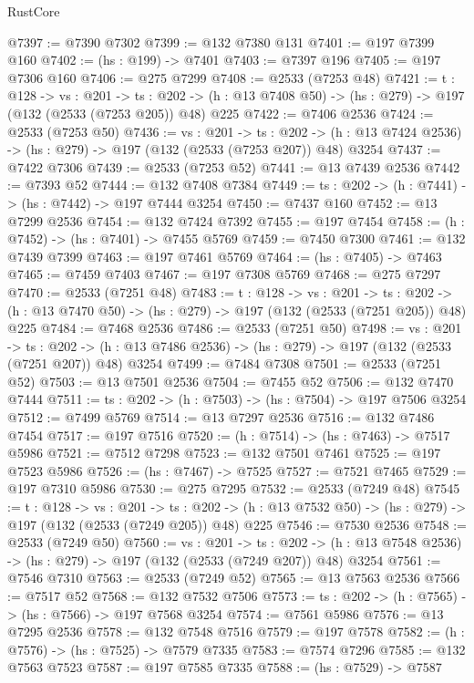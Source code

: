 \begin{lexlean}{RustCore}
\begin{coremodule}
@7397 := @7390 @7302
@7399 := @132 @7380 @131
@7401 := @197 @7399 @160
@7402 := (hs : @199) -> @7401
@7403 := @7397 @196
@7405 := @197 @7306 @160
@7406 := @275 @7299
@7408 := @2533 (@7253 @48)
@7421 := {t : @128} ->
  {vs : @201} ->
  {ts : @202} -> (h : @13 @7408 @50) -> (hs : @279) -> @197 (@132 (@2533 (@7253 @205)) @48) @225
@7422 := @7406 @2536
@7424 := @2533 (@7253 @50)
@7436 := {vs : @201} ->
  {ts : @202} -> (h : @13 @7424 @2536) -> (hs : @279) -> @197 (@132 (@2533 (@7253 @207)) @48) @3254
@7437 := @7422 @7306
@7439 := @2533 (@7253 @52)
@7441 := @13 @7439 @2536
@7442 := @7393 @52
@7444 := @132 @7408 @7384
@7449 := {ts : @202} -> (h : @7441) -> (hs : @7442) -> @197 @7444 @3254
@7450 := @7437 @160
@7452 := @13 @7299 @2536
@7454 := @132 @7424 @7392
@7455 := @197 @7454
@7458 := (h : @7452) -> (hs : @7401) -> @7455 @5769
@7459 := @7450 @7300
@7461 := @132 @7439 @7399
@7463 := @197 @7461 @5769
@7464 := (hs : @7405) -> @7463
@7465 := @7459 @7403
@7467 := @197 @7308 @5769
@7468 := @275 @7297
@7470 := @2533 (@7251 @48)
@7483 := {t : @128} ->
  {vs : @201} ->
  {ts : @202} -> (h : @13 @7470 @50) -> (hs : @279) -> @197 (@132 (@2533 (@7251 @205)) @48) @225
@7484 := @7468 @2536
@7486 := @2533 (@7251 @50)
@7498 := {vs : @201} ->
  {ts : @202} -> (h : @13 @7486 @2536) -> (hs : @279) -> @197 (@132 (@2533 (@7251 @207)) @48) @3254
@7499 := @7484 @7308
@7501 := @2533 (@7251 @52)
@7503 := @13 @7501 @2536
@7504 := @7455 @52
@7506 := @132 @7470 @7444
@7511 := {ts : @202} -> (h : @7503) -> (hs : @7504) -> @197 @7506 @3254
@7512 := @7499 @5769
@7514 := @13 @7297 @2536
@7516 := @132 @7486 @7454
@7517 := @197 @7516
@7520 := (h : @7514) -> (hs : @7463) -> @7517 @5986
@7521 := @7512 @7298
@7523 := @132 @7501 @7461
@7525 := @197 @7523 @5986
@7526 := (hs : @7467) -> @7525
@7527 := @7521 @7465
@7529 := @197 @7310 @5986
@7530 := @275 @7295
@7532 := @2533 (@7249 @48)
@7545 := {t : @128} ->
  {vs : @201} ->
  {ts : @202} -> (h : @13 @7532 @50) -> (hs : @279) -> @197 (@132 (@2533 (@7249 @205)) @48) @225
@7546 := @7530 @2536
@7548 := @2533 (@7249 @50)
@7560 := {vs : @201} ->
  {ts : @202} -> (h : @13 @7548 @2536) -> (hs : @279) -> @197 (@132 (@2533 (@7249 @207)) @48) @3254
@7561 := @7546 @7310
@7563 := @2533 (@7249 @52)
@7565 := @13 @7563 @2536
@7566 := @7517 @52
@7568 := @132 @7532 @7506
@7573 := {ts : @202} -> (h : @7565) -> (hs : @7566) -> @197 @7568 @3254
@7574 := @7561 @5986
@7576 := @13 @7295 @2536
@7578 := @132 @7548 @7516
@7579 := @197 @7578
@7582 := (h : @7576) -> (hs : @7525) -> @7579 @7335
@7583 := @7574 @7296
@7585 := @132 @7563 @7523
@7587 := @197 @7585 @7335
@7588 := (hs : @7529) -> @7587

\end{coremodule}
\end{lexlean}
